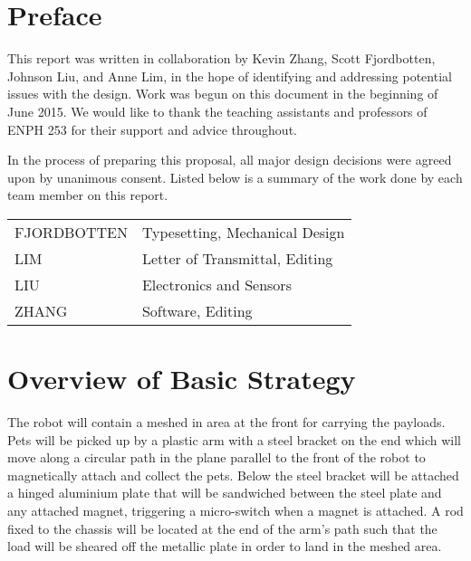 \documentclass[11pt, oneside]{article} %
\begin{document}
\section{Preface}

This report was written in collaboration by Kevin Zhang, Scott Fjordbotten, Johnson Liu, and Anne Lim, in the hope of identifying and addressing potential issues with the design. Work was begun on this document in the beginning of June 2015. We would like to thank the teaching assistants and professors of ENPH 253 for their support and advice throughout.

In the process of preparing this proposal, all major design decisions were agreed upon by unanimous consent. Listed below is a summary of the work done by each team member on this report.

\begin{center}
	\begin{tabular}{ l l }
		FJORDBOTTEN & Typesetting, Mechanical Design \\
		LIM & Letter of Transmittal, Editing \\
		LIU & Electronics and Sensors \\
		ZHANG & Software, Editing \\
	\end{tabular}
\end{center}

\section{Overview of Basic Strategy}

The robot will contain a meshed in area at the front for carrying the payloads. Pets will be picked up by a plastic arm with a steel bracket on the end which will move along a circular path in the plane parallel to the front of the robot to magnetically attach and collect the pets. Below the steel bracket will be attached a hinged aluminium plate that will be sandwiched between the steel plate and any attached magnet, triggering a micro-switch when a magnet is attached. A rod fixed to the chassis will be located at the end of the arm's path such that the load will be sheared off the metallic plate in order to land in the meshed area.
\end{document}
